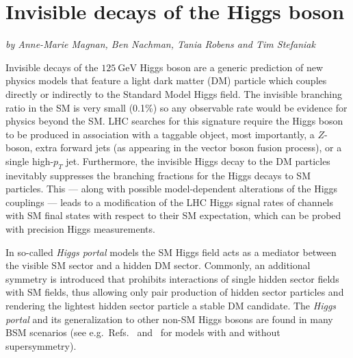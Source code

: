 \documentclass[../report.tex]{subfiles}
\begin{document}
\section{Invisible decays of the Higgs boson}\label{Sec:6Invisible}

\begin{center}
\textit{by Anne-Marie Magnan, Ben Nachman, Tania Robens and Tim Stefaniak}
\end{center} 

Invisible decays of the $125~\mathrm{GeV}$ Higgs boson are a generic prediction of new physics models that feature a light dark matter (DM) particle which couples directly or indirectly to the Standard Model Higgs field. The invisible branching ratio in the SM is very small (0.1\%) so any observable rate would be evidence for physics beyond the SM.  LHC searches for this signature require the Higgs boson to be produced in association with a taggable object, most importantly, a $Z$-boson, extra forward jets (as appearing in the vector boson fusion process), or a single high-$p_T$ jet. Furthermore, the invisible Higgs decay to the DM particles inevitably suppresses the branching fractions for the Higgs decays to SM particles. This --- along with possible model-dependent alterations of the Higgs couplings --- leads to a modification of the LHC Higgs signal rates of channels with SM final states with respect to their SM expectation, which can be probed with precision Higgs measurements. 

In so-called \emph{Higgs portal} models the SM Higgs field acts as a mediator between the visible SM sector and a hidden DM sector. {Commonly,} an additional symmetry {is introduced that} prohibits interactions of single hidden sector fields with SM fields, thus allowing only pair production of hidden sector particles and rendering the lightest hidden sector particle a stable DM candidate. 
The \emph{Higgs portal} and its generalization to other non-SM Higgs bosons are found in many BSM scenarios (see e.g.~Refs.~\cite{McDonald:2008up,McDonald:2008ua,ArkaniHamed:2006mb,Profumo:2017ntc} and~\cite{Barger:2008jx,Cohen:2011ec,Englert:2011yb,Goudelis:2013uca,Bai:2012nv,Berlin:2015wwa} for models with and without supersymmetry). 
\end{document}
